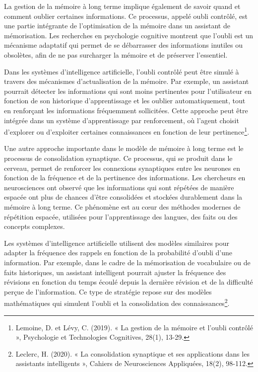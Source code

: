 \documentclass[11pt,a4paper]{report}
\begin{document}
La gestion de la mémoire à long terme implique également de savoir quand et comment oublier certaines informations. Ce processus, appelé oubli contrôlé, est une partie intégrante de l’optimisation de la mémoire dans un assistant de mémorisation. Les recherches en psychologie cognitive montrent que l’oubli est un mécanisme adaptatif qui permet de se débarrasser des informations inutiles ou obsolètes, afin de ne pas surcharger la mémoire et de préserver l’essentiel.

Dans les systèmes d’intelligence artificielle, l’oubli contrôlé peut être simulé à travers des mécanismes d’actualisation de la mémoire. Par exemple, un assistant pourrait détecter les informations qui sont moins pertinentes pour l’utilisateur en fonction de son historique d’apprentissage et les oublier automatiquement, tout en renforçant les informations fréquemment sollicitées. Cette approche peut être intégrée dans un système d’apprentissage par renforcement, où l’agent choisit d’explorer ou d’exploiter certaines connaissances en fonction de leur pertinence\footnote{Lemoine, D. et Lévy, C. (2019). « La gestion de la mémoire et l'oubli contrôlé », Psychologie et Technologies Cognitives, 28(1), 13-29.}.

Une autre approche importante dans le modèle de mémoire à long terme est le processus de consolidation synaptique. Ce processus, qui se produit dans le cerveau, permet de renforcer les connexions synaptiques entre les neurones en fonction de la fréquence et de la pertinence des informations. Les chercheurs en neurosciences ont observé que les informations qui sont répétées de manière espacée ont plus de chances d’être consolidées et stockées durablement dans la mémoire à long terme. Ce phénomène est au cœur des méthodes modernes de répétition espacée, utilisées pour l'apprentissage des langues, des faits ou des concepts complexes.

Les systèmes d'intelligence artificielle utilisent des modèles similaires pour adapter la fréquence des rappels en fonction de la probabilité d’oubli d’une information. Par exemple, dans le cadre de la mémorisation de vocabulaire ou de faits historiques, un assistant intelligent pourrait ajuster la fréquence des révisions en fonction du temps écoulé depuis la dernière révision et de la difficulté perçue de l’information. Ce type de stratégie repose sur des modèles mathématiques qui simulent l'oubli et la consolidation des connaissances\footnote{Leclerc, H. (2020). « La consolidation synaptique et ses applications dans les assistants intelligents », Cahiers de Neurosciences Appliquées, 18(2), 98-112.}.
\end{document}
